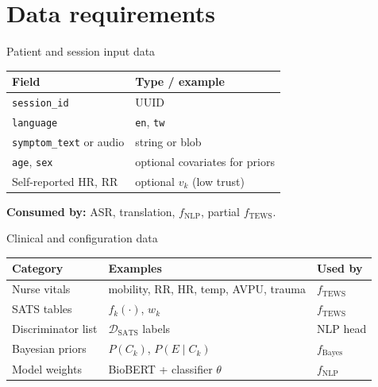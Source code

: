 \documentclass[aspectratio=169,11pt]{beamer}
\begin{document}
\section{Data requirements}

\begin{frame}{Patient and session input data}
	\small
	\begin{tabular}{@{}p{}p{}@{}}
		\toprule
		\textbf{Field} & \textbf{Type / example} \\
		\midrule
		\texttt{session\_id} & UUID \\
		\texttt{language} & \texttt{en}, \texttt{tw} \\
		\texttt{symptom\_text} or audio & string or blob \\
		\texttt{age}, \texttt{sex} & optional covariates for priors \\
		Self-reported HR, RR & optional $v_k$ (low trust) \\
		\bottomrule
	\end{tabular}

	\textbf{Consumed by:} ASR, translation, $f_{\text{NLP}}$, partial $f_{\text{TEWS}}$.
\end{frame}

\begin{frame}{Clinical and configuration data}
	\small
	\begin{tabular}{@{}p{}p{}p{}@{}}
		\toprule
		\textbf{Category} & \textbf{Examples} & \textbf{Used by} \\
		\midrule
		Nurse vitals & mobility, RR, HR, temp, AVPU, trauma & $f_{\text{TEWS}}$ \\
		SATS tables & $f_k(\cdot)$, $w_k$ & $f_{\text{TEWS}}$ \\
		Discriminator list & $\mathcal{D}_{\text{SATS}}$ labels & NLP head \\
		Bayesian priors & $P(C_k)$, $P(E\mid C_k)$ & $f_{\text{Bayes}}$ \\
		Model weights & BioBERT + classifier $\theta$ & $f_{\text{NLP}}$ \\
		\bottomrule
	\end{tabular}
\end{frame}
\end{document}
